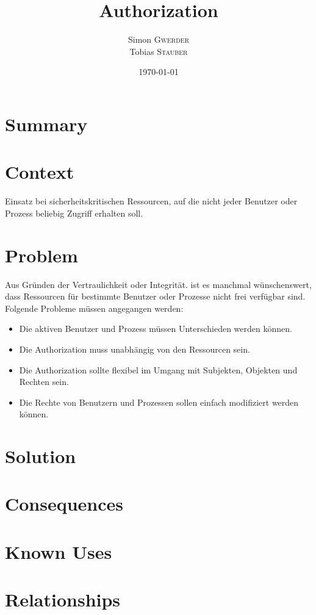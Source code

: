 \documentclass{article}
\title{Authorization} %
\author{Simon \textsc{Gwerder}\\Tobias \textsc{Stauber}} %
\date{\today} %
\begin{document}
	
	\maketitle %
	
	
	\section{Summary}
	
	\section{Context}
	Einsatz bei sicherheitskritischen Ressourcen, auf die nicht jeder Benutzer oder Prozess beliebig Zugriff erhalten soll.
	
	\section{Problem}
	Aus Gründen der Vertraulichkeit oder Integrität. ist es manchmal wünschenswert, dass Ressourcen für bestimmte Benutzer oder Prozesse nicht frei verfügbar sind. Folgende Probleme müssen angegangen werden:\\
	\begin{itemize}{}{ }
		\item Die aktiven Benutzer und Prozess müssen Unterschieden werden können.
		\item Die Authorization muss unabhängig von den Ressourcen sein.
		\item Die Authorization sollte flexibel im Umgang mit Subjekten, Objekten und Rechten sein.
		\item Die Rechte von Benutzern und Prozessen sollen einfach modifiziert werden können.
	\end{itemize}

\section{Solution}

\section{Consequences}

\section{Known Uses}

\section{Relationships}




\end{document}
